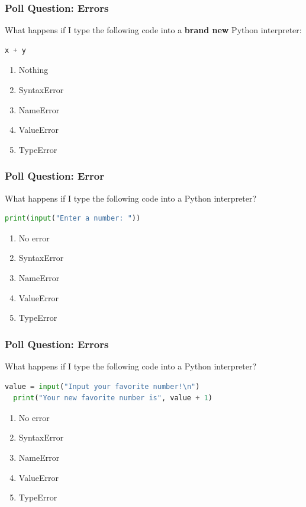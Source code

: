 \documentclass{beamer}
\begin{document}
%
%
%
\begin{frame}[fragile]
  \frametitle{Poll Question: Errors}
  What happens if I type the following code into a \textbf{brand new} Python interpreter:
  \begin{lstlisting}[language=Python]
  x + y \end{lstlisting}
  \begin{enumerate}
    \item Nothing
    \item SyntaxError
    \item NameError
    \item ValueError
    \item TypeError
  \end{enumerate}
\end{frame}

%
%
%
\begin{frame}[fragile]
  \frametitle{Poll Question: Error}
  What happens if I type the following code into a Python interpreter?
  \begin{lstlisting}[language=Python]
  print(input("Enter a number: "))\end{lstlisting}
  \begin{enumerate}
    \item No error
    \item SyntaxError
    \item NameError
    \item ValueError
    \item TypeError
  \end{enumerate}
\end{frame}

%
%
%
\begin{frame}[fragile]
  \frametitle{Poll Question: Errors}
  What happens if I type the following code into a Python interpreter?
  \begin{lstlisting}[language=Python]
  value = input("Input your favorite number!\n")
  print("Your new favorite number is", value + 1)\end{lstlisting}
  \begin{enumerate}
    \item No error
    \item SyntaxError
    \item NameError
    \item ValueError
    \item TypeError
  \end{enumerate}
\end{frame}
\end{document}
